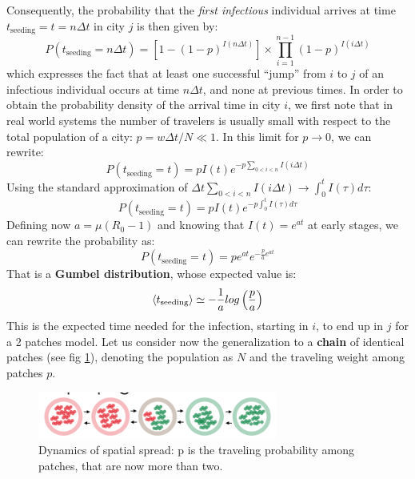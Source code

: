 \documentclass[../main/main.tex]{subfiles}
\begin{document}
Consequently, the probability that the \textit{first infectious} individual arrives at time $t_{\text{seeding}} = t = n\Delta t$ in city $j$ is then given by:
\begin{equation}
    P(t_{\text{seeding}}= n\Delta t ) = [1-(1-p)^{I(n\Delta t)}] \times  \prod_{i=1}^{n-1} (1-p)^{I(i \Delta t)}
\end{equation}
which expresses the fact that at least one successful “jump” from $i$ to $j$ of an infectious individual occurs at time $n \Delta t$, and none at previous times. In order to obtain the probability density of the arrival time in city $i$, we first note that in real world systems the number of travelers is usually small with respect to the total population of a city: $p = w\Delta t/N \ll 1$. In this limit for $p \to 0$, we can rewrite:
\begin{equation*}
    P(t_{\text{seeding}}=t) = pI(t)e^{-p\sum_{0 < i <n} I(i\Delta t)}
\end{equation*}
Using the standard approximation of $\Delta t \sum_{0 < i <n} I(i\Delta t) \to \int_0^t I(\tau)d\tau$:
\begin{equation}
     P(t_{\text{seeding}}=t) = p I(t) e^{-p\int_0^t I(\tau)d\tau}
\end{equation}
Defining now $a = \mu (R_0 - 1)$ and knowing that $I(t) = e^{at}$ at early stages, we can rewrite the probability as:
\begin{equation}
    P(t_{\text{seeding}}=t) = pe^{at}e^{-\frac{p}{a}e^{at}}
\end{equation}
That is a \textbf{Gumbel distribution}, whose expected value is:
\begin{equation}
    \expval{t_{\text{seeding}}} \simeq - \frac{1}{a} log\left(\frac{p}{a}\right)
\end{equation}
This is the expected time needed for the infection, starting in $i$, to end up in $j$ for a 2 patches model.
Let us consider now the generalization to a \textbf{chain} of identical patches (see fig \ref{fig:14_02}), denoting the population as $N$ and the traveling weight among patches $p$.

\begin{figure}[h!]
\centering
\includegraphics[width=0.7\textwidth]{../lessons/image/15/image02.png}
\caption{\label{fig:14_02} Dynamics of spatial spread: p is the traveling probability among patches, that are now more than two.}
\end{figure}
\end{document}

